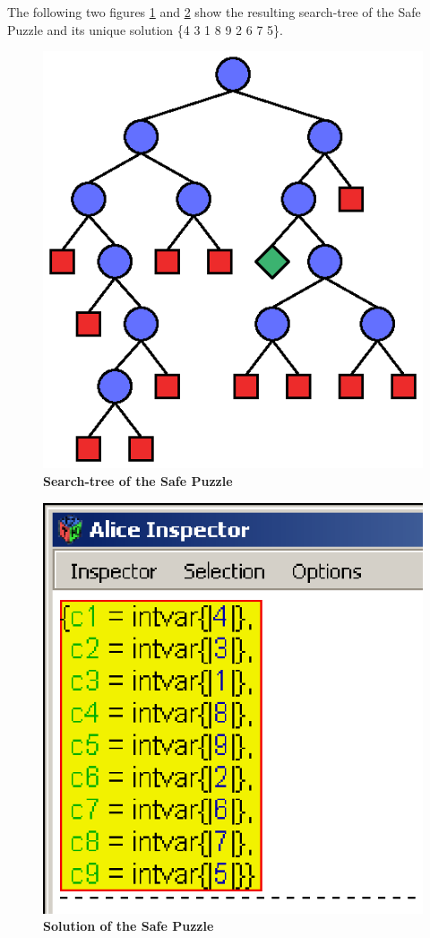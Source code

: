\documentclass[a4paper,halfparskip]{scrartcl}
\begin{document}
The following two figures \ref{figure9} and \ref{figure10} show the 
resulting search-tree of the Safe Puzzle and its unique solution \{4 3 1 8 9 2 6 7 5\}.
\begin{figure}[htpb]
\centerline{\includegraphics*[scale=1.0]{figs/explorer_safe_expl.eps}}
\caption{\textbf{Search-tree of the Safe Puzzle}}
\label{figure9}
\end{figure}
\begin{figure}[htpb]
\centerline{\includegraphics*[scale=1.0]{figs/solution_safe2.eps}}
\caption{\textbf{Solution of the Safe Puzzle}}
\label{figure10}
\end{figure}
\end{document}
